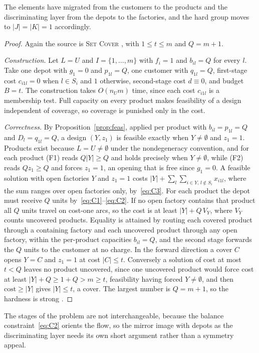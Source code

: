 The elements have migrated from the customers to the products and
the discriminating layer from the depots to the factories, and the
hard group moves to $|J|=|K|=1$ accordingly.

\begin{proof}
Again the source is \textsc{Set Cover} \citep{Karp1972}, with
$1\le t\le m$ and $Q=m+1$.

\emph{Construction.} Let $L=U$ and $I=\{1,\dots,m\}$ with $f_i=1$ and
$b_{il}=Q$ for every $l$. Take one depot with $g_1=0$ and $p_{1l}=Q$, one
customer with $q_{1l}=Q$, first-stage cost $c_{i1l}=0$ when $l\in S_i$
and $1$ otherwise, second-stage cost $d\equiv 0$, and budget $B=t$. The
construction takes $O(n_U m)$ time, since each cost $c_{i1l}$ is a
membership test. Full
capacity on every product makes feasibility of a design independent of
coverage, so coverage is punished only in the cost.

\emph{Correctness.} By Proposition~\ref{prop:feas}, applied per product
with $b_{il}=p_{1l}=Q$ and $D_l=q_{1l}=Q$, a design $(Y,z_1)$ is feasible
exactly when $Y\ne\emptyset$ and $z_1=1$. Products exist because
$L=U\ne\emptyset$ under the nondegeneracy convention, and for each
product (F1) reads $Q|Y|\ge Q$ and holds precisely when
$Y\ne\emptyset$, while (F2) reads $Qz_1\ge Q$ and forces $z_1=1$, an
opening that is free since $g_1=0$.
A feasible solution with open factories $Y$ and $z_1=1$ costs
$|Y|+\sum_l\sum_{i\in Y,\,l\notin S_i}x_{i1l}$, where the sum ranges over
open factories only, by~\eqref{eq:C3}. For each product the depot must receive $Q$ units
by~\eqref{eq:C1}--\eqref{eq:C2}. If no open factory contains that product
all $Q$ units travel on cost-one arcs, so the cost is at least
$|Y|+Q\,V_Y$, where $V_Y$ counts uncovered products. Equality is
attained by routing each covered product through a containing factory
and each uncovered product through any open factory, within the
per-product capacities $b_{il}=Q$, and the second stage forwards the $Q$
units to the customer at no charge. In
the forward direction a cover $C$ opens $Y=C$ and $z_1=1$ at cost
$|C|\le t$. Conversely a solution of cost at most $t<Q$ leaves no product
uncovered, since one uncovered product would force cost at least
$|Y|+Q\ge 1+Q>m\ge t$, feasibility having forced $Y\ne\emptyset$, and
then $\text{cost}\ge|Y|$ gives $|Y|\le t$, a cover. The
largest number is $Q=m+1$, so the hardness is strong
\citep{GareyJohnson1979}.
\end{proof}

The stages of the problem are not interchangeable, because the balance
constraint~\eqref{eq:C2} orients the flow, so the mirror image with
depots as the discriminating layer needs its own short argument rather
than a symmetry appeal.

